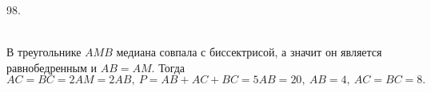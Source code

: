 98. \begin{figure}[ht!]
\end{figure}\\
В треугольнике $AMB$ медиана совпала с биссектрисой, а значит он является равнобедренным и $AB=AM.$ Тогда $AC=BC=2AM=2AB,\ P=AB+AC+BC=5AB=20,\ AB=4,\ AC=BC=8.$\\
